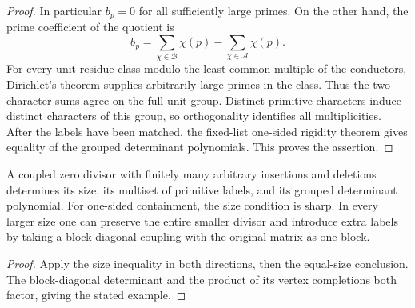 \begin{proof}
In particular $b_p=0$ for all sufficiently large primes. On the other hand, the prime coefficient of the quotient is
\[
 b_p=\sum_{\chi\in\mathcal B}\chi(p)-\sum_{\chi\in\mathcal A}\chi(p).
\]
For every unit residue class modulo the least common multiple of the conductors, Dirichlet's theorem supplies arbitrarily large primes in the class. Thus the two character sums agree on the full unit group. Distinct primitive characters induce distinct characters of this group, so orthogonality identifies all multiplicities. After the labels have been matched, the fixed-list one-sided rigidity theorem gives equality of the grouped determinant polynomials. This proves the assertion.
\end{proof}

\begin{corollary}\label{cor:blind-symmetric}
A coupled zero divisor with finitely many arbitrary insertions and deletions determines its size, its multiset of primitive labels, and its grouped determinant polynomial. For one-sided containment, the size condition is sharp. In every larger size one can preserve the entire smaller divisor and introduce extra labels by taking a block-diagonal coupling with the original matrix as one block.
\end{corollary}
\begin{proof}
Apply the size inequality in both directions, then the equal-size conclusion. The block-diagonal determinant and the product of its vertex completions both factor, giving the stated example.
\end{proof}

